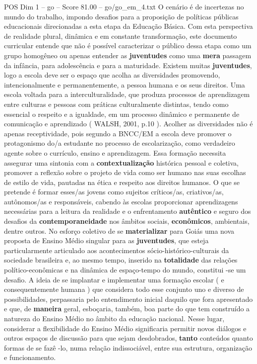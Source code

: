 \begin{textsample}{POS Dim 1 – go – Score 81.00 – go/go\_em\_4.txt}
O cenário é de incertezas no mundo do trabalho, impondo desafios para a proposição de políticas públicas educacionais direcionadas a esta etapa da Educação Básica.
Com esta perspectiva de realidade plural, dinâmica e em constante transformação, este documento curricular entende que não é possível caracterizar o público dessa etapa como um grupo homogêneo ou apenas entender as \textbf{juventudes} como uma \textbf{mera} passagem da infância, para adolescência e para a maturidade.
Existem muitas \textbf{juventudes}, logo a escola deve ser o espaço que acolha as diversidades promovendo, intencionalmente e permanentemente, a pessoa humana e os seus direitos.
Uma escola voltada para a interculturalidade, que produza processos de aprendizagem entre culturas e pessoas com práticas culturalmente distintas, tendo como essencial o respeito e a igualdade, em um processo dinâmico e permanente de comunicação e aprendizado ( WALSH, 2001, p.10 ).
Acolher as diversidades não é apenas receptividade, pois segundo a BNCC/EM a escola deve promover o protagonismo do/a estudante no processo de escolarização, como verdadeiro agente sobre o currículo, ensino e aprendizagem.
Essa formação necessita assegurar uma sintonia com a \textbf{contextualização} histórica pessoal e coletiva, promover a reflexão sobre o projeto de vida como ser humano nas suas escolhas de estilo de vida, pautadas na ética e respeito aos direitos humanos.
O que se pretende é formar esses/as jovens como sujeitos críticos/as, criativos/as, autônomos/as e responsáveis, cabendo às escolas proporcionar aprendizagens necessárias para a leitura da realidade e o enfrentamento \textbf{autêntico} e seguro dos desafios da \textbf{contemporaneidade} nos âmbitos sociais, \textbf{econômicos}, ambientais, dentre outros.
No esforço coletivo de se \textbf{materializar} para Goiás uma nova proposta de Ensino Médio singular para as \textbf{juventudes}, que esteja particularmente articulado aos acontecimentos sócio-histórico-culturais da sociedade brasileira e, ao mesmo tempo, inserido na \textbf{totalidade} das relações político-econômicas e na dinâmica de espaço-tempo do mundo, constitui -se um desafio.
A ideia de se implantar e implementar uma formação escolar ( e consequentemente humana ) que considera todo esse conjunto uno e diverso de possibilidades, perpassaria pelo entendimento inicial daquilo que fora apresentado e que, de \textbf{maneira} geral, esboçaria, também, boa parte do que tem construído a natureza do Ensino Médio no âmbito da educação nacional.
Nesse lugar, considerar a flexibilidade do Ensino Médio significaria permitir novos diálogos e outros espaços de discussão para que sejam desdobrados, \textbf{tanto} conteúdos quanto formas de se fazê -lo, numa relação indissociável, entre sua estrutura, organização e funcionamento.

\end{textsample}
